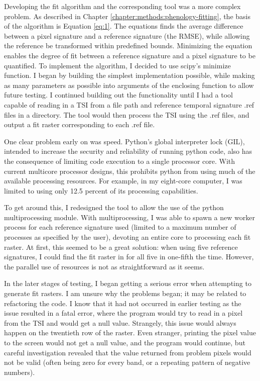 Developing the fit algorithm and the corresponding tool was a more complex problem. As described in Chapter \ref{chapter:methods:phenology-fitting}, the basis of the algorithm is Equation \ref{eq:1}. The equations finds the average difference between a pixel signature and a reference signature (the RMSE), while allowing the reference be transformed within predefined bounds. Minimizing the equation enables the degree of fit between a reference signature and a pixel signature to be quantified. To implement the algorithm, I decided to use scipy’s minimize function. I began by building the simplest implementation possible, while making as many parameters as possible into arguments of the enclosing function to allow future testing. I continued building out the functionality until I had a tool capable of reading in a TSI from a file path and reference temporal signature .ref files in a directory. The tool would then process the TSI using the .ref files, and output a fit raster corresponding to each .ref file.

One clear problem early on was speed. Python’s global interpreter lock (GIL), intended to increase the security and reliability of running python code, also has the consequence of limiting code execution to a single processor core. With current multicore processor designs, this prohibits python from using much of the available processing resources. For example, in my eight-core computer, I was limited to using only 12.5 percent of its processing capabilities.

To get around this, I redesigned the tool to allow the use of the python multiprocessing module. With multiprocessing, I was able to spawn a new worker process for each reference signature used (limited to a maximum number of processes as specified by the user), devoting an entire core to processing each fit raster. At first, this seemed to be a great solution: when using five reference signatures, I could find the fit raster in for all five in one-fifth the time. However, the parallel use of resources is not as straightforward as it seems.

In the later stages of testing, I began getting a serious error when attempting to generate fit rasters. I am unsure why the problems began; it may be related to refactoring the code. I know that it had not occurred in earlier testing as the issue resulted in a fatal error, where the program would try to read in a pixel from the TSI and would get a null value. Strangely, this issue would always happen on the twentieth row of the raster. Even stranger, printing the pixel value to the screen would not get a null value, and the program would continue, but careful investigation revealed that the value returned from problem pixels would not be valid (often being zero for every band, or a repeating pattern of negative numbers).

